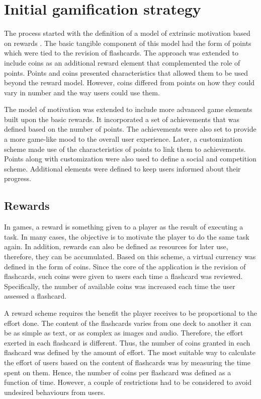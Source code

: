 \section{Initial gamification strategy}
\label{desi-gamification-strategy}
The process started with the definition of a model of extrinsic motivation based on rewards \citep{richter2015studying}. The basic tangible component of this model had the form of points which were tied to the revision of flashcards. The approach was extended to include coins as an additional reward element that complemented the role of points. Points and coins presented characteristics that allowed them to be used beyond the reward model. However, coins differed from points on how they could vary in number and the way users could use them.

The model of motivation was extended to include more advanced game elements built upon the basic rewards. It incorporated a set of achievements that was defined based on the number of points. The achievements were also set to provide a more game-like mood to the overall user experience. Later, a customization scheme made use of the characteristics of points to link them to achievements. Points along with customization were also used to define a social and competition scheme. Additional elements were defined to keep users informed about their progress.

\subsection{Rewards}
In games, a reward is something given to a player as the result of executing a task. In many cases, the objective is to motivate the player to do the same task again. In addition, rewards can also be defined as resources for later use, therefore, they can be accumulated. Based on this scheme, a virtual currency was defined in the form of coins. Since the core of the application is the revision of flashcards, such coins were given to users each time a flashcard was reviewed. Specifically, the number of available coins was increased each time the user assessed a flashcard.

A reward scheme requires the benefit the player receives to be proportional to the effort done. The content of the flashcards varies from one deck to another it can be as simple as text, or as complex as images and audio. Therefore, the effort exerted in each flashcard is different. Thus, the number of coins granted in each flashcard was defined by the amount of effort. The most suitable way to calculate the effort of users based on the content of flashcards was by measuring the time spent on them. Hence, the number of coins per flashcard was defined as a function of time. However, a couple of restrictions had to be considered to avoid undesired behaviours from users.


